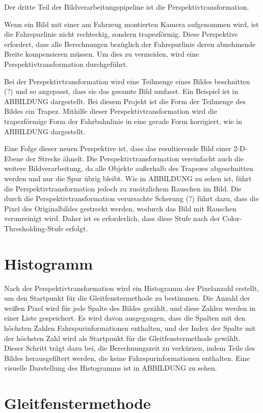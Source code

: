 \documentclass[arbeit=studie,oneside,BCOR=12mm]{ArbeitRST}
\begin{document}
Der dritte Teil der Bildverarbeitungspipeline ist die Perspektivtransformation. 

Wenn ein Bild mit einer am Fahrzeug montierten Kamera aufgenommen wird, ist die
Fahrspurlinie nicht rechteckig, sondern trapezförmig. Diese Perspektive
erfordert, dass alle Berechnungen bezüglich der Fahrspurlinie deren abnehmende
Breite kompensieren müssen. Um dies zu vermeiden, wird eine
Perspektivtransformation durchgeführt. 

Bei der Perspektivtransformation wird eine Teilmenge eines Bildes beschnitten
(?) und so angepasst, dass sie das gesamte Bild umfasst. Ein Beispiel ist in
ABBILDUNG dargestellt. Bei diesem Projekt ist die Form der Teilmenge des Bildes
ein Trapez. Mithilfe dieser Perspektivtransformation wird die trapezförmige
Form der Fahrbahnlinie in eine gerade Form korrigiert, wie in ABBILDUNG
dargestellt.

Eine Folge dieser neuen Perspektive ist, dass das resultierende Bild einer
2-D-Ebene der Strecke ähnelt. Die Perspektivtransformation vereinfacht auch die
weitere Bildverarbeitung, da alle Objekte außerhalb des Trapezes abgeschnitten
werden und nur die Spur übrig bleibt. Wie in ABBILDUNG zu sehen ist, führt die
Perspektivtransformation jedoch zu zusätzlichem Rauschen im Bild. Die durch die
Perspektivtransformation verursachte Scherung (?) führt dazu, dass die Pixel des
Originalbildes gestreckt werden, wodurch das Bild mit Rauschen verunreinigt
wird. Daher ist es erforderlich, dass diese Stufe nach der
\glqq Color-Thresholding\grqq-Stufe erfolgt.

\section{Histogramm}

Nach der Perspektivtransformation wird ein Histogramm der Pixelanzahl erstellt,
um den Startpunkt für die Gleitfenstermethode zu bestimmen. Die Anzahl der
weißen Pixel wird für jede Spalte des Bildes gezählt, und diese Zahlen werden
in einer Liste gespeichert. Es wird davon ausgegangen, dass die Spalten mit den
höchsten Zahlen Fahrspurinformationen enthalten, und der Index der Spalte mit
der höchsten Zahl wird als Startpunkt für die Gleitfenstermethode gewählt.
Dieser Schritt trägt dazu bei, die Berechnungszeit zu verkürzen, indem Teile
des Bildes herausgefiltert werden, die keine Fahrspurinformationen enthalten.
Eine visuelle Darstellung des Histogramms ist in ABBILDUNG zu sehen.

\section{Gleitfenstermethode}
\end{document}
